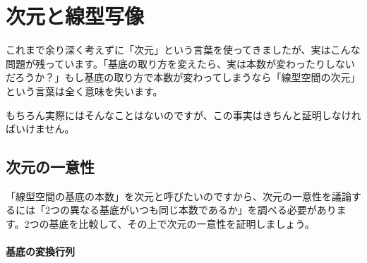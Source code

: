 \section{次元と線型写像}

これまで余り深く考えずに「次元」という言葉を使ってきましたが、実はこんな問題が残っています。「基底の取り方を変えたら、実は本数が変わったりしないだろうか？」もし基底の取り方で本数が変わってしまうなら「線型空間の次元」という言葉は全く意味を失います。

もちろん実際にはそんなことはないのですが、この事実はきちんと証明しなければいけません。

\subsection{次元の一意性} \label{subsec:uniqueness_of_dimension}

「線型空間の基底の本数」を次元と呼びたいのですから、次元の一意性を議論するには「$2$つの異なる基底がいつも同じ本数であるか」を調べる必要があります。$2$つの基底を比較して、その上で次元の一意性を証明しましょう。

\paragraph{基底の変換行列}

